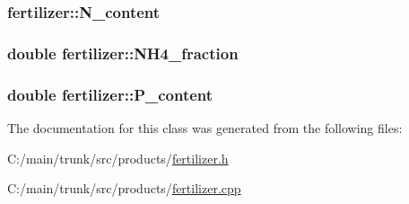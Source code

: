 \hypertarget{classfertilizer_af6513d3d34f339522280ee00f8c44f3e}{
\subsubsection[{N\_\-content}]{ {\bf fertilizer::N\_\-content}}}
\label{classfertilizer_af6513d3d34f339522280ee00f8c44f3e}
\hypertarget{classfertilizer_a9fff79dfc73ee1cde5edaef8b74813d0}{
\subsubsection[{NH4\_\-fraction}]{\setlength{\rightskip}{0pt plus 5cm}double {\bf fertilizer::NH4\_\-fraction}}}
\label{classfertilizer_a9fff79dfc73ee1cde5edaef8b74813d0}
\hypertarget{classfertilizer_a2e586559d4fb3b123391ee4c7815f166}{
\subsubsection[{P\_\-content}]{\setlength{\rightskip}{0pt plus 5cm}double {\bf fertilizer::P\_\-content}}}
\label{classfertilizer_a2e586559d4fb3b123391ee4c7815f166}


The documentation for this class was generated from the following files:\begin{DoxyCompactItemize}
\item 
C:/main/trunk/src/products/\hyperlink{fertilizer_8h}{fertilizer.h}\item 
C:/main/trunk/src/products/\hyperlink{fertilizer_8cpp}{fertilizer.cpp}\end{DoxyCompactItemize}
